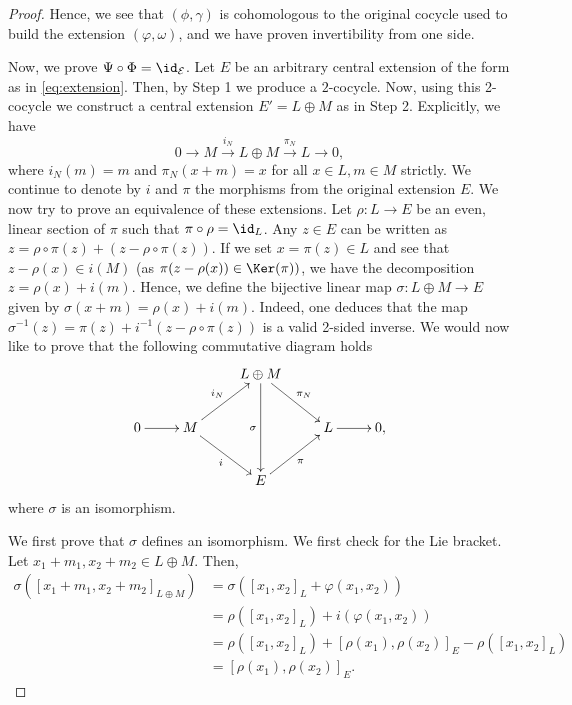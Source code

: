 \documentclass[12pt]{amsart}
\begin{document}
\begin{proof}
Hence, we see that $(\phi,\gamma)$ is cohomologous to the original cocycle used to build the extension $(\varphi, \omega)$, and we have proven invertibility from one side.

\vspace{0.5 em}

Now, we prove $\Psi \circ \Phi = \id_{\mathcal{E}}$. Let $E$ be an arbitrary central extension of the form as in \eqref{eq:extension}. Then, by Step 1 we produce a $2$-cocycle.  Now, using this 2-cocycle we construct a central extension $E'=L\oplus M$ as in Step 2. Explicitly, we have
\begin{equation*}
0 \longrightarrow M \xrightarrow{i_N} L \oplus M \xrightarrow{\pi_N} L \longrightarrow 0,
\end{equation*}
where $i_N(m)=m$ and $\pi_{N}(x+m)=x$ for all $x \in L, m\in M$ strictly. We continue to denote by $i$ and $\pi$ the morphisms from the original extension $E$. We now try to prove an equivalence of these extensions. Let $\rho: L \longrightarrow E$ be an even, linear section of $\pi$ such that $\pi \circ \rho=\id_{L}$. Any $z\in E$ can be written as $z= \rho\circ\pi(z)+(z-\rho\circ\pi(z))$. If we set $x=\pi(z) \in L$ and see that $z-\rho(x) \in i(M)$ (as $\pi(z-\rho(x)) \in \Ker(\pi))$, we have the  decomposition $z=\rho(x)+i(m)$. Hence, we define the bijective linear map $\sigma: L \oplus M \longrightarrow E$ given by $\sigma(x+m)=\rho(x)+i(m)$. Indeed, one deduces that the map $\sigma^{-1}(z)=\pi(z)+i^{-1}(z-\rho\circ\pi(z))$ is a valid 2-sided inverse. We would now like to prove that the following commutative diagram holds
\begin{equation}\label{diagram2}
  \xymatrix{
     && L \oplus M \ar[dr]^{\pi_N} \ar[dd]_{\sigma} & \\
     0 \ar[r] & M \ar[ur]^{i_N} \ar[dr]_{i} && L \ar[r] & 0, \\
     && E \ar[ur]_{\pi} 
  }
\end{equation}
where $\sigma$ is an isomorphism.

We first prove that $\sigma$ defines an isomorphism. We first check for the Lie bracket. Let $x_1+m_1, x_2+m_2 \in L \oplus M$. Then,
\begin{align*}
\sigma([x_1+m_1,x_2+m_2]_{L\oplus M})&=\sigma([x_1,x_2]_L+\varphi(x_1,x_2))\\
&=\rho([x_1,x_2]_L)+i(\varphi(x_1,x_2))\\
&=\rho([x_1,x_2]_L)+[\rho(x_1),\rho(x_2)]_E-\rho([x_1,x_2]_L)\\
&=[\rho(x_1),\rho(x_2)]_E.
\end{align*}


\end{proof}
\end{document}
